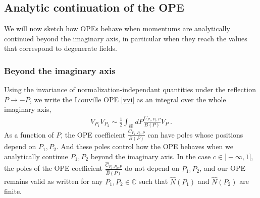 \documentclass[12pt, a4paper, notitlepage, twoside]{report}
\numberwithin{equation}{section}
\theoremstyle{break}
\begin{document}
\subsection{Analytic continuation of the OPE}\label{secacl}

We will now sketch how OPEs behave when momentums are analytically continued beyond the imaginary axis, in particular when they reach the values that correspond to degenerate fields.

\subsubsection{Beyond the imaginary axis}

Using the invariance of normalization-independant quantities under the reflection $P\to -P$, we write the Liouville OPE \eqref{vvi} as an integral over the whole imaginary axis,
\begin{align}
 V_{P_1}V_{P_2} \sim \frac12\int_{i{\mathbb{R}}} dP \frac{C_{P_1,P_2,P}}{B(P)} V_P\ .
 \label{vvir}
\end{align}
As a function of $P$, the OPE coefficient $\frac{C_{P_1,P_2,P}}{B(P)}$ can have poles whose positions depend on $P_1,P_2$. 
And these poles control how the OPE behaves when we analytically continue $P_1,P_2$ beyond the imaginary axis. In the case $c\in ]-\infty, 1]$, the poles of the OPE coefficient $\frac{\hat C_{P_1,P_2,P}}{\hat B(P)}$ do not depend on $P_1,P_2$, and our OPE remains valid as written for any $P_1,P_2\in\mathbb{C}$ such that $\hat N(P_1)$ and $\hat N(P_2)$ are finite.
\end{document}
